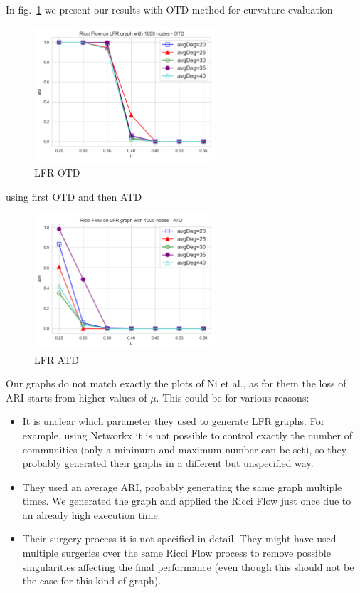 In fig.~\ref{fig:LFR_OTD} we present our results with OTD method for curvature evaluation
\begin{figure}
    \centering
    \includegraphics[width=0.6\textwidth]{../tests/LFRResults/LFR_OTD.png}
    \caption{LFR OTD}
    \label{fig:LFR_OTD}
\end{figure}

using first OTD and then ATD
\begin{figure}
    \centering
    \includegraphics[width=0.6\textwidth]{../tests/LFRResults/LFR_ATD.png}
    \caption{LFR ATD}
    \label{fig:LFR_ATD}
\end{figure}

Our graphs do not match exactly the plots of Ni et al., as for them the loss of ARI starts from higher values of $\mu$. This could be for various reasons:
\begin{itemize}
    \item It is unclear which parameter they used to generate LFR graphs. For example, using Networkx it is not possible to control exactly the number of communities (only a minimum and maximum number can be set), so they probably generated their graphs in a different but unspecified way.
    \item They used an average ARI, probably generating the same graph multiple times. We generated the graph and applied the Ricci Flow just once due to an already high execution time.
    \item Their surgery process it is not specified in detail. They might have used multiple surgeries over the same Ricci Flow process to remove possible singularities affecting the final performance (even though this should not be the case for this kind of graph).
\end{itemize}